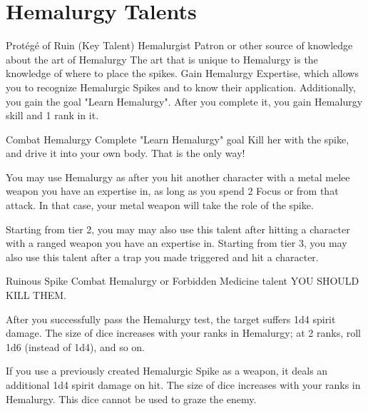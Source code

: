 \section{Hemalurgy Talents}
\label{sec:hemalurgyTalents}

\newcommand{\goalLearnHemalurgyName}{Learn Hemalurgy}
\newcommand{\talentHemalurgyKeyName}{Prot\'eg\'e of Ruin}
\newcommand{\talentMeleeHemalurgyName}{Combat Hemalurgy}
\newcommand{\talentRangeddHemalurgyName}{Ranged Hemalurgy}
\newcommand{\talentTrapHemalurgyName}{Hemalurgic Traps}
\newcommand{\talentSpikeStackingName}{Stacking Potency}
\newcommand{\talentSpikeDdeathlessName}{Deathless Spike}
\newcommand{\talentSpikeRuinousName}{Ruinous Spike}
\newcommand{\talentCreateLinchpinName}{Steel Linchpin}
\newcommand{\talentStealTraceName}{Vestigial Powers}
\newcommand{\talentHemalurgyMedicineName}{Forbidden Medicine}
\newcommand{\talentSinisterIntentName}{Sinister Mastery}


\talent
	{\talentHemalurgyKeyName{} (Key Talent)}
	{Hemalurgist Patron or other source of knowledge about the art of Hemalurgy}
	{\iconSpecial}
	{The art that is unique to Hemalurgy is the knowledge of where to place the spikes.}
	{
		Gain Hemalurgy Expertise, which allows you to recognize Hemalurgic Spikes and to know their application. Additionally, you gain the goal "\goalLearnHemalurgyName{}". After you complete it, you gain Hemalurgy skill and 1 rank in it.
	}
	
\talent
	{\talentMeleeHemalurgyName{}}
	{Complete "\goalLearnHemalurgyName{}" goal}
	{\iconConstant}
	{Kill her with the spike, and drive it into your own body. That is the only way!}
	{
		You may use Hemalurgy as \iconAction{} after you hit another character with a metal melee weapon you have an expertise in, as long as you spend 2 Focus or \iconOpp{} from that attack. In that case, your metal weapon will take the role of the spike.
		
		Starting from tier 2, you may may also use this talent after hitting a character with a ranged weapon you have an expertise in.	Starting from tier 3, you may also use this talent after a trap you made triggered and hit a character. 
	}
	
\talent
	{\talentSpikeRuinousName{}}
	{\talentMeleeHemalurgyName{} or \talentHemalurgyMedicineName{} talent}
	{\iconConstant}
	{YOU SHOULD KILL THEM.}
	{
		After you successfully pass the Hemalurgy test, the target suffers 1d4 spirit damage. The size of dice increases with your ranks in Hemalurgy; at 2 ranks, roll 1d6 (instead of 1d4), and so on.
		
		If you use a previously created Hemalurgic Spike as a weapon, it deals an additional 1d4 spirit damage on hit. The size of dice increases with your ranks in Hemalurgy. This dice cannot be used to graze the enemy.
	}


